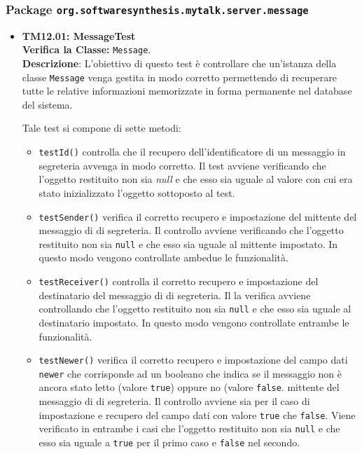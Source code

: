 \subsubsection{Package \texttt{org.softwaresynthesis.mytalk.server.message}}
\begin{itemize}

\item[\passed] \textbf{TM12.01: MessageTest}\\
\textbf{Verifica la Classe:} \texttt{Message}.\\
\textbf{Descrizione}: L'obiettivo di questo test è controllare che un'istanza della classe  \texttt{Message} venga gestita in modo corretto permettendo di recuperare tutte le relative informazioni memorizzate in forma permanente nel database del sistema.

Tale test si compone di sette metodi:
\begin{itemize}
\item \texttt{testId()} controlla che il recupero dell'identificatore di un messaggio in segreteria avvenga in modo corretto. 
Il test avviene verificando che l'oggetto restituito non sia \textit{null} e che esso sia uguale al valore con cui era stato inizializzato l'oggetto sottoposto al test.
\item \texttt{testSender()} verifica il corretto recupero e impostazione del mittente del messaggio di di segreteria.
Il controllo avviene verificando che l'oggetto restituito non sia \texttt{null} e che esso sia uguale al mittente impostato. In questo modo vengono controllate ambedue le funzionalità.
\item \texttt{testReceiver()} controlla il corretto recupero e impostazione del destinatario del messaggio di di segreteria.
Il la verifica avviene controllando che l'oggetto restituito non sia \texttt{null} e che esso sia uguale al destinatario impostato. In questo modo vengono controllate entrambe le funzionalità. 

\item \texttt{testNewer()} verifica il corretto recupero e impostazione del campo dati \texttt{newer} che corrisponde ad un booleano che indica se il messaggio non è ancora stato letto (valore \texttt{true}) oppure no (valore \texttt{false}.  mittente del messaggio di di segreteria.
Il controllo avviene sia per il caso di impostazione e recupero del campo dati con valore 	\texttt{true} che 	\texttt{false}. Viene verificato in entrambe i casi che l'oggetto restituito non sia \texttt{null} e che esso sia uguale a \texttt{true} per il primo caso e \texttt{false} nel secondo.


\end{itemize}
\end{itemize}
